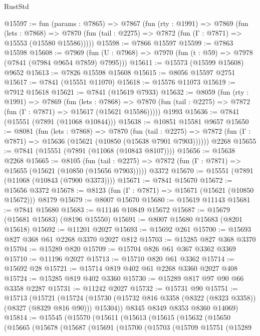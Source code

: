 \begin{lexlean}{RustStd}
\begin{coremodule}
{\begin{coremodule}
{{{{{{{{{{{{{{{{{{{{{{{{{{{{{{{{{{{{{{{{{{{{{{{{{{{{{{@15597 := fun (params : @7865) =>
  @7867
    (fun (rty : @1991) =>
    @7869
      (fun (lets : @7868) =>
      @7870 (fun (tail : @2275) => @7872 (fun (Γ : @7871) => @15553 (@15580 @15586)))))
@15598 := @7866 @15597
@15599 := @7863 @15598
@15608 := @7969
    (fun (U : @7968) => @7970 (fun (t : @59) => @7978 (@7841 (@7984 @9654 @7859) @7995)))
@15611 := @15573 (@15599 @15608) @9652
@15613 := @7826 @15598 @15608
@15615 := @8056 @15597 @2751
@15617 := @7841 (@15551 @11070)
@15618 := @15576 @11073
@15619 := @7912 @15618
@15621 := @7841 (@15619 @7933)
@15632 := @8059
    (fun (rty : @1991) =>
    @7869
      (fun (lets : @7868) =>
      @7870 (fun (tail : @2275) => @7872 (fun (Γ : @7871) => @15617 (@15621 @15586)))))
    @1993
@15636 := @7841 (@15551 (@7891 (@11068 @10844)))
@15638 := @10851 @15581 @9657
@15650 := @8081
    (fun (lets : @7868) =>
    @7870
      (fun (tail : @2275) =>
      @7872 (fun (Γ : @7871) => @15636 (@15621 (@10850 (@15638 @7901 @7903))))))
    @2268
@15655 := @7841 (@15551 (@7891 (@11068 (@10843 @8107))))
@15656 := @15638 @2268
@15665 := @8105
    (fun (tail : @2275) => @7872 (fun (Γ : @7871) => @15655 (@15621 (@10850 (@15656 @7903)))))
    @3372
@15670 := @15551 (@7891 (@11068 (@10843 (@7900 @3373))))
@15671 := @7841 @15670
@15672 := @15656 @3372
@15678 := @8123 (fun (Γ : @7871) => @15671 (@15621 (@10850 @15672))) @8179
@15679 := @8007 @15670
@15680 := @15619 @11143
@15681 := @7841 @15680
@15683 := @11146 @10849 @15672
@15687 := @15679 (@15681 @15683) (@8196 @15550)
@15691 := @8007 @15680 @15683 (@8201 @15618)
@15692 := @11201 @2027
@15693 := @15692 @261
@15700 := @15693 @827 @368 @61 @2268 @3370 @2027 @812
@15703 := @15285 @827 @368 @3370
@15704 := @15289 @820
@15709 := @15704 @826 @61 @367 @3362 @3369
@15710 := @11196 @2027
@15713 := @15710 @820 @61 @3362
@15714 := @15692 @28
@15721 := @15714 @819 @402 @61 @2268 @3360 @2027 @408
@15724 := @15285 @819 @402 @3360
@15730 := @15289 @817 @97 @90 @66 @3358 @2287
@15731 := @11242 @2027
@15732 := @15731 @90
@15751 := @15713
    (@15721
      (@15724 (@15730 (@15732 @816 @3358 (@8322 (@8323 @3358)) (@8327 (@8329 @816 @90))) @15304))
      @8345
      @8349
      @8353
      @8360
      @14069)
@15814 := @15545
    (@15570
      (@15611
        (@15613
          (@15615
            (@15632
              (@15650
                (@15665
                  (@15678
                    (@15687
                      (@15691
                        (@15700
                          (@15703
                            (@15709
                              @15751
                              (@15289
}}}}}}}}}}}}}}}}}}}}}}}}}}}}}}}}}}}}}}}}}}}}}}}}}}}}}}
\end{coremodule}}
\end{coremodule}
\end{lexlean}

